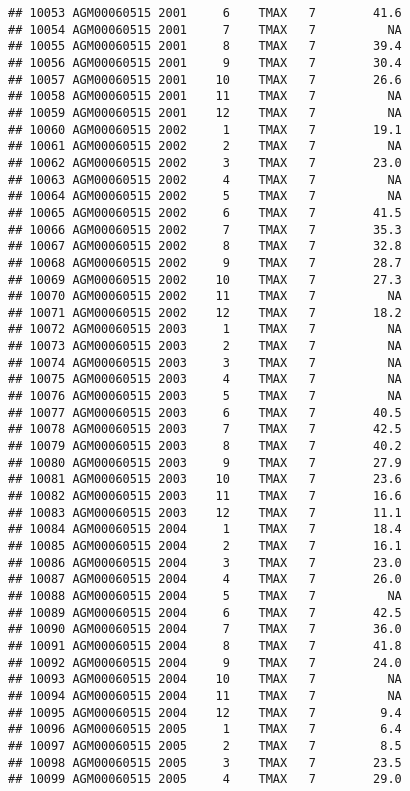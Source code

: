 \documentclass{article}\usepackage[]{graphicx}\usepackage[]{color}
\makeatletter
\newenvironment{kframe}{%
 \def\at@end@of@kframe{}%
 \ifinner\ifhmode%
  \def\at@end@of@kframe{\end{minipage}}%
  \begin{minipage}{\columnwidth}%
 \fi\fi%
 \def\FrameCommand##1{\hskip\@totalleftmargin \hskip-\fboxsep
 \colorbox{shadecolor}{##1}\hskip-\fboxsep
     \hskip-\linewidth \hskip-\@totalleftmargin \hskip\columnwidth}%
 \MakeFramed {\advance\hsize-\width
   \@totalleftmargin\z@ \linewidth\hsize
   \@setminipage}}%
 {\par\unskip\endMakeFramed%
 \at@end@of@kframe}
\newenvironment{knitrout}{}{} %
\makeatother
\begin{document}
\begin{knitrout}
\begin{kframe}
\begin{verbatim}
## 10053 AGM00060515 2001     6    TMAX   7        41.6
## 10054 AGM00060515 2001     7    TMAX   7          NA
## 10055 AGM00060515 2001     8    TMAX   7        39.4
## 10056 AGM00060515 2001     9    TMAX   7        30.4
## 10057 AGM00060515 2001    10    TMAX   7        26.6
## 10058 AGM00060515 2001    11    TMAX   7          NA
## 10059 AGM00060515 2001    12    TMAX   7          NA
## 10060 AGM00060515 2002     1    TMAX   7        19.1
## 10061 AGM00060515 2002     2    TMAX   7          NA
## 10062 AGM00060515 2002     3    TMAX   7        23.0
## 10063 AGM00060515 2002     4    TMAX   7          NA
## 10064 AGM00060515 2002     5    TMAX   7          NA
## 10065 AGM00060515 2002     6    TMAX   7        41.5
## 10066 AGM00060515 2002     7    TMAX   7        35.3
## 10067 AGM00060515 2002     8    TMAX   7        32.8
## 10068 AGM00060515 2002     9    TMAX   7        28.7
## 10069 AGM00060515 2002    10    TMAX   7        27.3
## 10070 AGM00060515 2002    11    TMAX   7          NA
## 10071 AGM00060515 2002    12    TMAX   7        18.2
## 10072 AGM00060515 2003     1    TMAX   7          NA
## 10073 AGM00060515 2003     2    TMAX   7          NA
## 10074 AGM00060515 2003     3    TMAX   7          NA
## 10075 AGM00060515 2003     4    TMAX   7          NA
## 10076 AGM00060515 2003     5    TMAX   7          NA
## 10077 AGM00060515 2003     6    TMAX   7        40.5
## 10078 AGM00060515 2003     7    TMAX   7        42.5
## 10079 AGM00060515 2003     8    TMAX   7        40.2
## 10080 AGM00060515 2003     9    TMAX   7        27.9
## 10081 AGM00060515 2003    10    TMAX   7        23.6
## 10082 AGM00060515 2003    11    TMAX   7        16.6
## 10083 AGM00060515 2003    12    TMAX   7        11.1
## 10084 AGM00060515 2004     1    TMAX   7        18.4
## 10085 AGM00060515 2004     2    TMAX   7        16.1
## 10086 AGM00060515 2004     3    TMAX   7        23.0
## 10087 AGM00060515 2004     4    TMAX   7        26.0
## 10088 AGM00060515 2004     5    TMAX   7          NA
## 10089 AGM00060515 2004     6    TMAX   7        42.5
## 10090 AGM00060515 2004     7    TMAX   7        36.0
## 10091 AGM00060515 2004     8    TMAX   7        41.8
## 10092 AGM00060515 2004     9    TMAX   7        24.0
## 10093 AGM00060515 2004    10    TMAX   7          NA
## 10094 AGM00060515 2004    11    TMAX   7          NA
## 10095 AGM00060515 2004    12    TMAX   7         9.4
## 10096 AGM00060515 2005     1    TMAX   7         6.4
## 10097 AGM00060515 2005     2    TMAX   7         8.5
## 10098 AGM00060515 2005     3    TMAX   7        23.5
## 10099 AGM00060515 2005     4    TMAX   7        29.0

\end{verbatim}
\end{kframe}
\end{knitrout}
\end{document}

